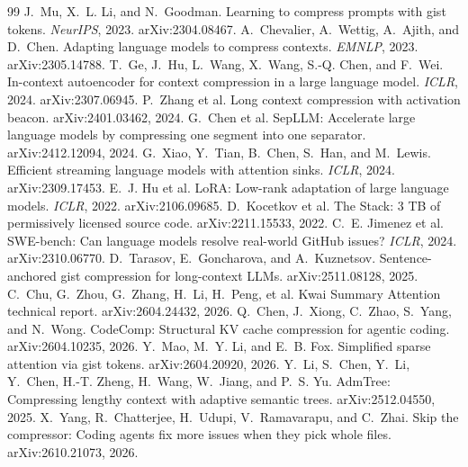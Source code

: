 \documentclass[11pt]{article}
\begin{document}
\begin{thebibliography}{99}
J.~Mu, X.~L. Li, and N.~Goodman. Learning to compress prompts with gist tokens.
\emph{NeurIPS}, 2023. arXiv:2304.08467.
A.~Chevalier, A.~Wettig, A.~Ajith, and D.~Chen. Adapting language models to
compress contexts. \emph{EMNLP}, 2023. arXiv:2305.14788.
T.~Ge, J.~Hu, L.~Wang, X.~Wang, S.-Q. Chen, and F.~Wei. In-context autoencoder
for context compression in a large language model. \emph{ICLR}, 2024.
arXiv:2307.06945.
P.~Zhang et al. Long context compression with activation beacon.
arXiv:2401.03462, 2024.
G.~Chen et al. SepLLM: Accelerate large language models by compressing one
segment into one separator. arXiv:2412.12094, 2024.
G.~Xiao, Y.~Tian, B.~Chen, S.~Han, and M.~Lewis. Efficient streaming language
models with attention sinks. \emph{ICLR}, 2024. arXiv:2309.17453.
E.~J. Hu et al. LoRA: Low-rank adaptation of large language models.
\emph{ICLR}, 2022. arXiv:2106.09685.
D.~Kocetkov et al. The Stack: 3 TB of permissively licensed source code.
arXiv:2211.15533, 2022.
C.~E. Jimenez et al. SWE-bench: Can language models resolve real-world GitHub
issues? \emph{ICLR}, 2024. arXiv:2310.06770.
D.~Tarasov, E.~Goncharova, and A.~Kuznetsov. Sentence-anchored gist
compression for long-context LLMs. arXiv:2511.08128, 2025.
C.~Chu, G.~Zhou, G.~Zhang, H.~Li, H.~Peng, et al. Kwai Summary Attention
technical report. arXiv:2604.24432, 2026.
Q.~Chen, J.~Xiong, C.~Zhao, S.~Yang, and N.~Wong. CodeComp: Structural KV
cache compression for agentic coding. arXiv:2604.10235, 2026.
Y.~Mao, M.~Y. Li, and E.~B. Fox. Simplified sparse attention via gist tokens.
arXiv:2604.20920, 2026.
Y.~Li, S.~Chen, Y.~Li, Y.~Chen, H.-T. Zheng, H.~Wang, W.~Jiang, and P.~S. Yu.
AdmTree: Compressing lengthy context with adaptive semantic trees.
arXiv:2512.04550, 2025.
X.~Yang, R.~Chatterjee, H.~Udupi, V.~Ramavarapu, and C.~Zhai. Skip the
compressor: Coding agents fix more issues when they pick whole files.
arXiv:2610.21073, 2026.
\end{thebibliography}
\end{document}
